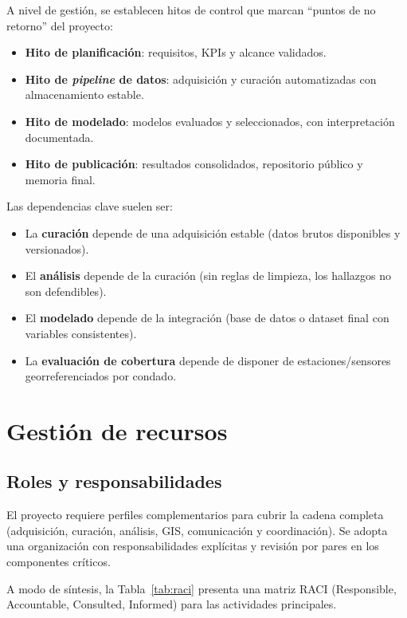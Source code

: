 A nivel de gestión, se establecen hitos de control que marcan ``puntos de no retorno'' del proyecto:
\begin{itemize}
    \item \textbf{Hito de planificación}: requisitos, KPIs y alcance validados.
    \item \textbf{Hito de \emph{pipeline} de datos}: adquisición y curación automatizadas con almacenamiento estable.
    \item \textbf{Hito de modelado}: modelos evaluados y seleccionados, con interpretación documentada.
    \item \textbf{Hito de publicación}: resultados consolidados, repositorio público y memoria final.
\end{itemize}

Las dependencias clave suelen ser:
\begin{itemize}
    \item La \textbf{curación} depende de una adquisición estable (datos brutos disponibles y versionados).
    \item El \textbf{análisis} depende de la curación (sin reglas de limpieza, los hallazgos no son defendibles).
    \item El \textbf{modelado} depende de la integración (base de datos o dataset final con variables consistentes).
    \item La \textbf{evaluación de cobertura} depende de disponer de estaciones/sensores georreferenciados por condado.
\end{itemize}

\section{Gestión de recursos}\label{sec:gestion-de-recursos}

\subsection{Roles y responsabilidades}\label{subsec:roles-y-responsabilidades}

El proyecto requiere perfiles complementarios para cubrir la cadena completa
(adquisición, curación, análisis, GIS, comunicación y coordinación).
Se adopta una organización con responsabilidades explícitas y revisión por pares en los componentes críticos.

A modo de síntesis, la Tabla~\ref{tab:raci} presenta una matriz RACI (Responsible, Accountable,
Consulted, Informed) para las actividades principales.

